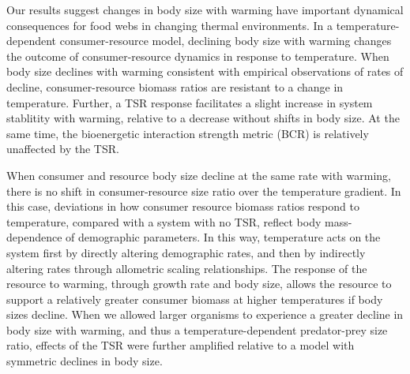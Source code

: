 \documentclass[11pt]{article}
\begin{document}
Our results suggest changes in body size with warming have important dynamical consequences for food webs in changing thermal environments. In a temperature-dependent consumer-resource model, declining body size with warming changes the outcome of consumer-resource dynamics in response to temperature. When body size declines with warming consistent with empirical observations of rates of decline, consumer-resource biomass ratios are resistant to a change in temperature. Further, a TSR response facilitates a slight increase in system stablitity with warming, relative to a decrease without shifts in body size. At the same time, the bioenergetic interaction strength metric (BCR) is relatively unaffected by the TSR. 

When consumer and resource body size decline at the same rate with warming, there is no shift in consumer-resource size ratio over the temperature gradient. In this case, deviations in how consumer resource biomass ratios respond to temperature, compared with a system with no TSR, reflect body mass-dependence of demographic parameters. In this way, temperature acts on the system first by directly altering demographic rates, and then by indirectly altering rates through allometric scaling relationships. The response of the resource to warming, through growth rate and body size, allows the resource to support a relatively greater consumer biomass at higher temperatures if body sizes decline. When we allowed larger organisms to experience a greater decline in body size with warming, and thus a temperature-dependent predator-prey size ratio, effects of the TSR were further amplified relative to a model with symmetric declines in body size. 
\end{document}
